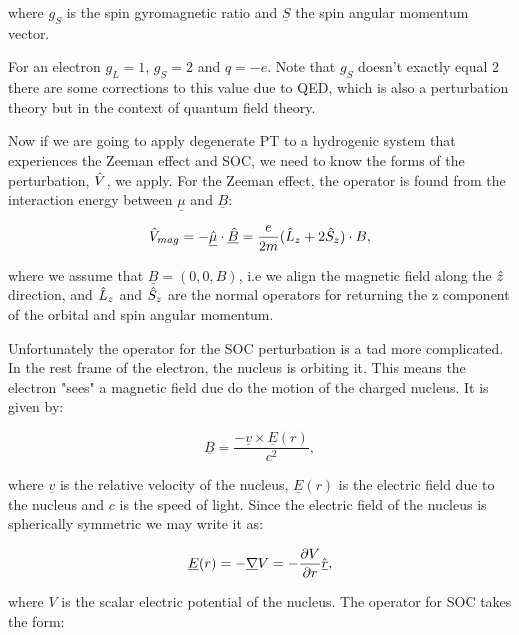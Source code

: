 \noindent where $g_S$ is the spin gyromagnetic ratio and $\underline{S}$ the spin angular momentum vector.

\noindent For an electron $g_L = 1$, $g_S = 2$ and $q = -e$. Note that $g_S$ doesn't exactly equal 2 there are some corrections to this value due to QED, which is also a perturbation theory but in the context of quantum field theory. 

\noindent Now if we are going to apply degenerate PT to a hydrogenic system that experiences the Zeeman effect and SOC, we need to know the forms of the perturbation, $\Hat{V}$, we apply. For the Zeeman effect, the operator is found from the interaction energy between $\underline\mu$ and $\underline{B}$:

\begin{equation}
    \Hat{V}_{mag} = - \underline{\Hat{\mu}} \cdot \underline{\Hat{B}} = \frac{e}{2m}(\Hat{L}_z + 2\Hat{S}_z) \cdot B,
    \label{ZeemanEffectPerturbation}
\end{equation}

\noindent where we assume that $\underline{B} = (0, 0, B)$, i.e we align the magnetic field along the $\Hat{z}$ direction, and $\Hat{L}_z$ and $\Hat{S}_z$ are the normal operators for returning the z component of the orbital and spin angular momentum.

\noindent Unfortunately the operator for the SOC perturbation is a tad more complicated. In the rest frame of the electron, the nucleus is orbiting it. This means the electron "sees" a magnetic field due do the motion of the charged nucleus. It is given by:

\begin{equation}
    \underline{B} = \frac{-\underline{v} \times \underline{E}(r)}{c^2},
    \label{MagneticFieldSOC}
\end{equation}

\noindent where $\underline{v}$ is the relative velocity of the nucleus, $\underline{E}(r)$ is the electric field due to the nucleus and $c$ is the speed of light. Since the electric field of the nucleus is spherically symmetric we may write it as:

\begin{equation}
    \underline{E}(r) = -\underline{\nabla} V = -\frac{\partial V}{\partial r} \Hat{\underline{r}},
    \label{SphericalElectricField}
\end{equation}

\noindent where $V$ is the scalar electric potential of the nucleus. The operator for SOC takes the form:

